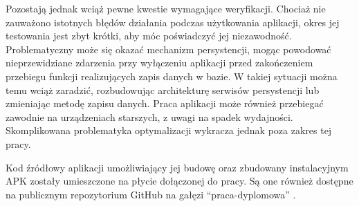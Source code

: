 \documentclass[12pt]{article}
\begin{document}
Pozostają jednak wciąż pewne kwestie wymagające weryfikacji. Chociaż nie zauważono istotnych błędów działania podczas użytkowania aplikacji,
okres jej testowania jest zbyt krótki, aby móc poświadczyć jej niezawodność.
Problematyczny może się okazać mechanizm persystencji,
mogąc powodować nieprzewidziane zdarzenia przy wyłączeniu aplikacji przed zakończeniem przebiegu funkcji realizujących zapis danych w bazie.
W takiej sytuacji można temu wciąż zaradzić, rozbudowując architekturę serwisów persystencji lub zmieniając metodę zapisu danych.
Praca aplikacji może również przebiegać zawodnie na urządzeniach starszych, z uwagi na spadek wydajności. Skomplikowana problematyka
optymalizacji wykracza jednak poza zakres tej pracy.

Kod źródłowy aplikacji umożliwiający jej budowę oraz zbudowany instalacyjnym APK zostały umieszczone na płycie dołączonej do pracy.
Są one również dostępne na publicznym repozytorium GitHub na gałęzi \enquote{praca-dyplomowa} \cite{source}.

\newpage
{}
\printbibliography

\listoffigures
\end{document}
